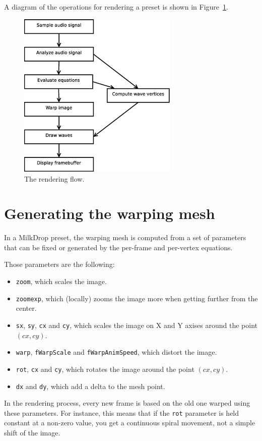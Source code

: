 \documentclass[a4paper,11pt]{article}
\begin{document}
A diagram of the operations for rendering a preset is shown in Figure~\ref{fig:flow}.
\begin{figure}[htp]
\centering
\includegraphics[height=80mm]{flow.eps}
\caption{The rendering flow.}\label{fig:flow}
\end{figure}

\section{Generating the warping mesh}
In a MilkDrop preset, the warping mesh is computed from a set of parameters that can be fixed or generated by the per-frame and per-vertex equations.

Those parameters are the following:
\begin{itemize}
\item \verb!zoom!, which scales the image.
\item \verb!zoomexp!, which (locally) zooms the image more when getting further from the center.
\item \verb!sx!, \verb!sy!, \verb!cx! and \verb!cy!, which scales the image on X and Y axises around the point $ (cx, cy) $.
\item \verb!warp!, \verb!fWarpScale! and \verb!fWarpAnimSpeed!, which distort the image.
\item \verb!rot!, \verb!cx! and \verb!cy!, which rotates the image around the point $ (cx, cy) $.
\item \verb!dx! and \verb!dy!, which add a delta to the mesh point.
\end{itemize}

In the rendering process, every new frame is based on the old one warped using these parameters. For instance, this means that if the \verb!rot! parameter is held constant at a non-zero value, you get a continuous spiral movement, not a simple shift of the image.
\end{document}
